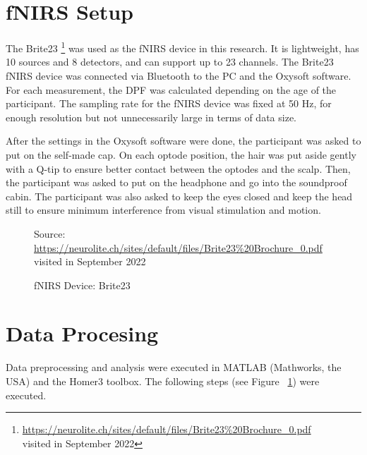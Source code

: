 \newpage 
\section {fNIRS Setup}
The Brite23 \footnote {\url{https://neurolite.ch/sites/default/files/Brite23\%20Brochure_0.pdf} \\ visited in September 2022} was used as the fNIRS device in this research. It is lightweight, has 10 sources and 8 detectors, and can support up to 23 channels. The Brite23 fNIRS device was connected via Bluetooth to the PC and the Oxysoft software. For each measurement, the DPF was calculated depending on the age of the participant. The sampling rate for the fNIRS device was fixed at 50 Hz, for enough resolution but not unnecessarily large in terms of data size.

After the settings in the Oxysoft software were done, the participant was asked to put on the self-made cap. On each optode position, the hair was put aside gently with a Q-tip to ensure better contact between the optodes and the scalp. Then, the participant was asked to put on the headphone and go into the soundproof cabin. The participant was also asked to keep the eyes closed and keep the head still to ensure minimum interference from visual stimulation and motion.

\begin{figure}[H]
  \centering
           {Source: \url{https://neurolite.ch/sites/default/files/Brite23\%20Brochure_0.pdf}\\ visited in September 2022}
     \caption{fNIRS Device: Brite23}
  \label{fig:flowchart}
\end{figure}


\section {Data Procesing}
Data preprocessing and analysis were executed in MATLAB (Mathworks, the USA) and the Homer3 toolbox. The following steps (see Figure ~\ref{fig:flowchart}) were executed.

